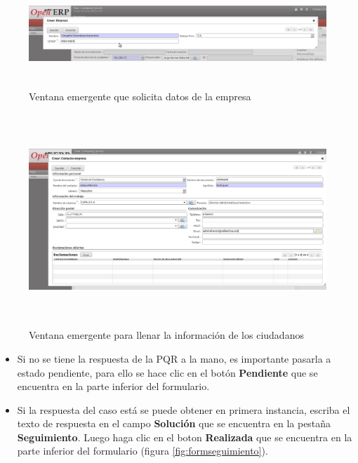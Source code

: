 \begin{figure}
 \centering
 \includegraphics[width=17cm,height=4cm]{./Imagenes/pantempresa.png}
 \caption{Ventana emergente que solicita datos de la empresa}
 \label{fig:pantempresa}
\end{figure}


\begin{figure}
 \centering
 \includegraphics[width=17cm,height=8cm]{./Imagenes/formusuario.png}
 \caption{Ventana emergente para llenar la información de los ciudadanos}
 \label{fig:formusuario}
\end{figure}

\begin{itemize}
 \item Si no se tiene la respuesta de la PQR a la mano, es importante pasarla a estado pendiente, para ello se hace clic en el botón \textbf{Pendiente} 
que se encuentra en la parte inferior del formulario. 
\item Si la respuesta del caso está se puede obtener en primera instancia, escriba el texto de respuesta en el campo \textbf{Solución} 
que se encuentra en la pestaña \textbf{Seguimiento}. Luego haga clic en el boton \textbf{Realizada} 
que se encuentra en la parte inferior del formulario (figura \ref{fig:formseguimiento}).
\end{itemize}


